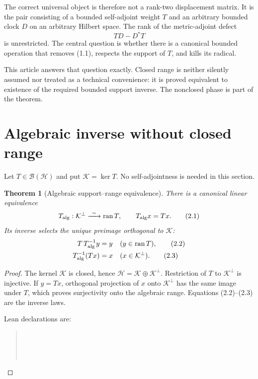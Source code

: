 \documentclass[11pt]{article}
\newtheorem{theorem}{Theorem}[section]
\theoremstyle{definition}
\theoremstyle{remark}
\newcommand{\Hh}{\mathcal H}
\newcommand{\K}{\mathcal K}
\newcommand{\ran}{\operatorname{ran}}
\newcommand{\kerop}{\operatorname{ker}}
\begin{document}
The correct universal object is therefore not a rank-two displacement matrix.  It is the pair
consisting of a bounded self-adjoint weight $T$ and an arbitrary bounded clock $D$ on an arbitrary
Hilbert space.  The rank of the metric-adjoint defect
\[
 TD-D^*T                                                     \tag{1.1}
\]
is unrestricted.  The central question is whether there is a canonical bounded operation that
removes (1.1), respects the support of $T$, and kills its radical.

This article answers that question exactly.  Closed range is neither silently assumed nor treated
as a technical convenience: it is proved equivalent to existence of the required bounded support
inverse.  The nonclosed phase is part of the theorem.

\section{Algebraic inverse without closed range}

Let $T\in\mathcal B(\Hh)$ and put $\K=\kerop T$.  No self-adjointness is needed in this section.

\begin{theorem}[Algebraic support--range equivalence]
\label{thm:algebraic}
There is a canonical linear equivalence
\[
 T_{\rm alg}:\K^\perp\xrightarrow{\ \sim\ }\ran T,
 \qquad T_{\rm alg}x=Tx.                                  \tag{2.1}
\]
Its inverse selects the unique preimage orthogonal to $\K$:
\begin{align}
 T\,T_{\rm alg}^{-1}y&=y &&(y\in\ran T),                 \tag{2.2}\\
 T_{\rm alg}^{-1}(Tx)&=x &&(x\in\K^\perp).              \tag{2.3}
\end{align}
\end{theorem}

\begin{proof}
The kernel $\K$ is closed, hence $\Hh=\K\oplus\K^\perp$.  Restriction of $T$ to $\K^\perp$ is
injective.  If $y=Tx$, orthogonal projection of $x$ onto $\K^\perp$ has the same image under $T$,
which proves surjectivity onto the algebraic range.  Equations (2.2)--(2.3) are the inverse laws.

Lean declarations are:
\begin{quote}\footnotesize
{}\\
\\
\\
\end{quote}
\end{proof}
\end{document}
